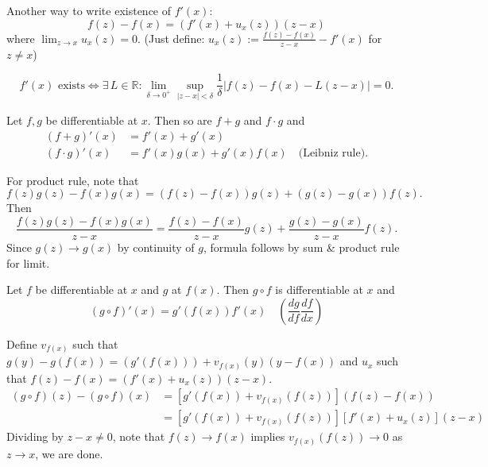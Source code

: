 \documentclass{notes}
\begin{document}
Another way to write existence of $f'(x)$: 
\[
  f(z) - f(x) = (f'(x) + u_x(z)) (z - x)
\]
where $\lim_{z \to x} u_x(z) = 0$.
(Just define: $u_x(z) := \frac{f(z) - f(x)}{z - x} - f'(x)$ for $z \neq x$)

\begin{lem}
  \[
    \text{$f'(x)$ exists} \Leftrightarrow \exists \, L \in \mathbb R: \lim_{\delta \to 0^+} \sup_{\left | z - x \right | < \delta} \frac{1}{\delta} \left | f(z) - f(x) - L (z - x) \right | = 0.
  \]
\end{lem}

\begin{lem}
  Let $f, g$ be differentiable at $x$.
  Then so are $f + g$ and $f \cdot g$ and 
  \begin{align*}
    (f + g)'(x) &= f'(x) + g'(x) \\ 
    (f \cdot g)'(x) &= f'(x) g(x) + g'(x) f(x) \quad \text{(Leibniz rule)}.
  \end{align*}
\end{lem}

\begin{prf} For product rule, note that  
  \[
    f(z) g(z) - f(x) g(x) = (f(z) - f(x)) g(z) + (g(z) - g(x)) f(z).
  \]
  Then 
  \[
    \frac{f(z) g(z) - f(x) g(x)}{z - x} = \frac{f(z) - f(x)}{z - x} g(z) + \frac{g(z) - g(x)}{z - x} f(z).
  \]
  Since $g(z) \to g(x)$ by continuity of $g$, formula follows by sum \& product rule for limit.
\end{prf}

\begin{lem}
  Let $f$ be differentiable at $x$ and $g$ at $f(x)$.
  Then $g \circ f$ is differentiable at $x$ and 
  \[
    (g \circ f)'(x) = g'(f(x)) f'(x) \quad \left ( \frac{dg}{df} \frac{df}{dx} \right )
  \]
\end{lem}

\newpage

\begin{prf}
  Define $v_{f(x)}$ such that $g(y) - g(f(x)) = (g'(f(x))) + v_{f(x)}(y) (y  - f(x))$ and $u_x$ such that $f(z) - f(x) = (f'(x) + u_x(z)) (z - x)$.
  \begin{align*}
    (g \circ f)(z) - (g \circ f)(x) &= [g'(f(x)) + v_{f(x)}(f(z))] (f(z) - f(x)) \\ 
    &= [g'(f(x)) + v_{f(x)}(f(z))] [f'(x) + u_x(z)] (z - x)
  \end{align*}
  Dividing by $z - x \neq 0$, note that $f(z) \to f(x)$ implies $v_{f(x)}(f(z)) \to 0$ as $z \to x$, we are done.
\end{prf}
\end{document}
